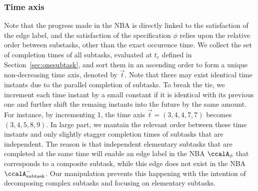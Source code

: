 \documentclass[journal]{IEEEtran}
\newcommand{\auto}[1]{\ccalA_{\text{#1}}}
\newcommand{\autop}{\ccalA_{\phi}}
\begin{document}
{{  \subsubsection{Time axis} Note that the progress made in the NBA is directly linked to the satisfaction of the edge label, and the satisfaction of  the specification $\phi$ relies upon the relative order between substasks, other than the exact occurence time. We collect the  set of completion times of all subtasks, evaluated at $t_e$ defined in Section~\ref{sec:onesubtask}, and sort them in an ascending order to form a unique non-decreasing time axis, denoted by $\vec{t}$. Note that there may exist identical time instants due to the parallel completion of subtasks. To break the tie, we increment each time instant by a small constant if it is identical with its previous one and further shift the remaing instants into the future by the same amount. For instance, by incrementing 1, the time axis $\vec{t}= (3, 4, 4, 7, 7)$ becomes $(3, 4, 5, 8, 9)$. In large part, we mantain the relevant order between these time instants and only slightly stagger completion times of subtasks that are independent. The reason is that independent elementary subtasks that are completed at the same time will enable an edge label in the NBA $\autop$ that corresponds to a composite subtask, while this edge does not exist in the NBA $\auto{subtask}^-$. Our manipulation prevents this happening with the intention of decomposing complex subtasks and focusing on elementary subtasks. }

}
\end{document}
